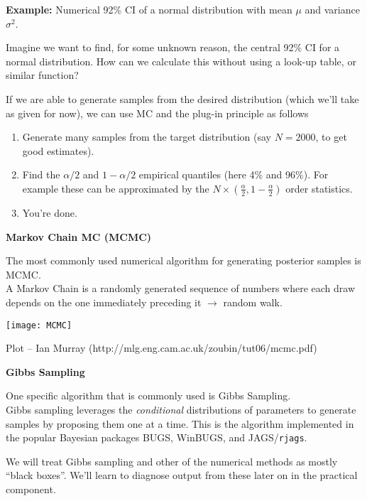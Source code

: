 \documentclass[12pt,xcolor=svgnames]{beamer}
\newcommand{\bl}{\color{blue}}
\newcommand{\theme}{\color{FireBrick}}
\newcommand{\fb}{\color{FireBrick}}
\newcommand{\sk}{\vspace{.4cm}}
\newcommand{\nochap}{\vspace{0.5cm}}
\newcommand{\chap}[1]{{\theme \Large \bf #1} \sk}
\begin{document}
\begin{frame}
\nochap

{\fb \bf Example:} Numerical 92\% CI of a normal distribution with mean $\mu$ and variance $\sigma^2$. 

\sk
Imagine we want to find, for some unknown reason, the central 92\% CI for a normal distribution.  How can we calculate this without using a look-up table, or similar function?

\sk
If we are able to generate samples from the desired distribution (which we'll take as given for now), we can use MC and the plug-in principle as follows

{\scriptsize
\begin{enumerate}
\item Generate many samples from the target distribution (say $N=2000$, to get good estimates).  
\item Find the $\alpha/2$ and $1-\alpha/2$ empirical quantiles (here 4\% and 96\%). For example these can be approximated by the $N \times \left( \frac{\alpha}{2} , 1-\frac{\alpha}{2} \right)$ order statistics.
\item You're done.
\end{enumerate}
}

\end{frame}



\begin{frame}
\chap{Markov Chain MC (MCMC)}

The most commonly used numerical algorithm for generating posterior samples is MCMC. \\

\sk
A {\bl Markov Chain} is a randomly generated sequence of numbers where each draw depends on the one immediately preceding it $\rightarrow$ random walk.


\begin{center}
\hspace{2.75cm} \texttt{[image: MCMC]}
\end{center}

\vfill
\hfill {\tiny Plot -- Ian Murray (http://mlg.eng.cam.ac.uk/zoubin/tut06/mcmc.pdf)} 
\end{frame}

\begin{frame}
\chap{Gibbs Sampling}

One specific algorithm that is commonly used is {\bl Gibbs Sampling}. \\

\sk
Gibbs sampling leverages the {\em conditional} distributions of parameters to generate samples by proposing them one at a time. This is the algorithm implemented in the popular Bayesian packages {\sf BUGS}, {\sf WinBUGS}, and {\sf JAGS}/{\tt rjags}. 

\sk 
We will treat Gibbs sampling and other of the numerical methods as mostly ``black boxes''. We'll learn to diagnose output from these later on in the practical component.


\end{frame}
\end{document}
